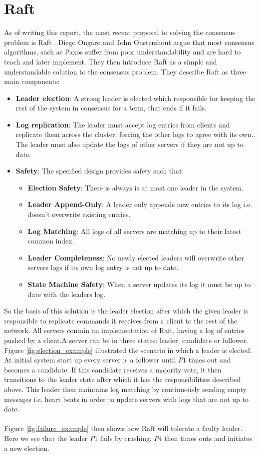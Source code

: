 \section{Raft}
As of writing this report, the most recent proposal to solving the consensus problem is Raft \cite{Raft}. Diego Ongaro and John Oustershout argue that most consensus algorithms, such as Paxos \cite{Paxos} suffer from poor understandability and are hard to teach and later implement. They then introduce Raft as a simple and understandable solution to the consensus problem. They describe Raft as three main components:
\begin{itemize}
\item \textbf{Leader election}: A strong leader is elected which responsible for keeping the rest of the system in consensus for a term, that ends if it fails.
\item \textbf{Log replication}: The leader must accept log entries from clients and replicate them across the cluster, forcing the other logs to agree with its own.\cite{Raft}. The leader must also update the logs of other servers if they are not up to date.
\item \textbf{Safety}: The specified design provides safety such that\cite{Raft}: 
    \begin{itemize}
    \item \textbf{Election Safety}: There is always is at most one leader in the system.
    \item \textbf{Leader Append-Only}: A leader only appends new entries to its log i.e. doesn't overwrite existing entries.
    \item \textbf{Log Matching}: All logs of all servers are matching up to their latest common index.
    \item \textbf{Leader Completeness}: No newly elected leaders will overwrite other servers logs if its own log entry is not up to date.
    \item \textbf{State Machine Safety}: When a server updates its log it must be up to date with the leaders log.
    \end{itemize}
\end{itemize}
So the basis of this solution is the leader election after which the given leader is responsible to replicate commands it receives from a client to the rest of the network. All servers contain an implementation of Raft, having a log of entries pushed by a client.A server can be in three states: leader, candidate or follower. Figure \ref{fig:election_example} illustrated the scenario in which a leader is elected. At initial system start up every server is a follower until $P1$ times out and becomes a candidate. If this candidate receives a majority vote, it then transitions to the leader state after which it has the responsibilities described above. This leader then maintains log matching by continuously sending empty messages i.e. heart beats in order to update servers with logs that are not up to date. \\ \\
Figure \ref{fig:failure_example} then shows how Raft will tolerate a faulty leader. Here we see that the leader $P1$ fails by crashing. $P4$ then times outs and initiates a new election.

